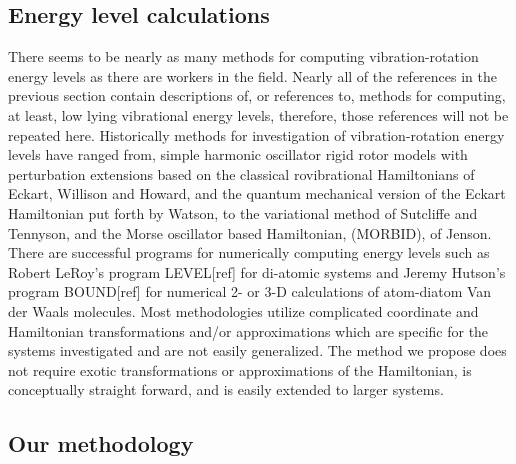 \documentclass[12pt,thmsa]{article}
\begin{document}
\subsection{Energy level calculations}

There seems to be nearly as many methods for computing vibration-rotation
energy levels as there are workers in the field. Nearly all of the
references in the previous section contain descriptions of, or references
to, methods for computing, at least, low lying vibrational energy levels,
therefore, those references will not be repeated here. Historically methods
for investigation of vibration-rotation energy levels have ranged from,
simple harmonic oscillator rigid rotor models with perturbation extensions
based on the classical rovibrational Hamiltonians of Eckart\cite{Eckart35},
Willison and Howard\cite{WilsonHoward36}, and the quantum mechanical version
of the Eckart Hamiltonian put forth by Watson\cite{Watson68}, to the
variational method of Sutcliffe and Tennyson\cite{SutcliffeTennyson87}, and
the Morse oscillator based Hamiltonian, (MORBID), of Jenson\cite{Jenson88}.
There are successful programs for numerically computing energy levels such
as Robert LeRoy's program LEVEL[ref] for di-atomic systems and Jeremy
Hutson's program BOUND[ref] for numerical 2- or 3-D calculations of
atom-diatom Van der Waals molecules. Most methodologies utilize complicated
coordinate and Hamiltonian transformations and/or approximations which are
specific for the systems investigated and are not easily generalized. The
method we propose does not require exotic transformations or approximations
of the Hamiltonian, is conceptually straight forward, and is easily extended
to larger systems.

\subsection{Our methodology}
\end{document}
